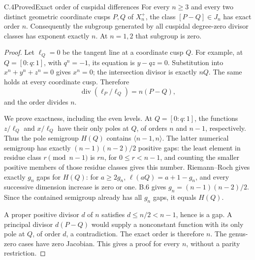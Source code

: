 \begin{statement}{C.4}{Proved}{Exact order of cuspidal differences}
For every \(n\ge3\) and every two distinct geometric coordinate
cusps \(P,Q\) of \(X_n^+\), the class \([P-Q]\in J_n\) has exact
order \(n\). Consequently the subgroup generated by all
cuspidal degree-zero divisor classes has exponent exactly \(n\).
At \(n=1,2\) that subgroup is zero.
\end{statement}
\begin{proof}
Let \(\ell_Q=0\) be the tangent line at a coordinate cusp \(Q\).
For example, at \(Q=[0:q:1]\), with \(q^n=-1\), its equation is
\(y-qz=0\). Substitution into \(x^n+y^n+z^n=0\) gives \(x^n=0\);
the intersection divisor is exactly \(nQ\). The same holds at
every coordinate cusp. Therefore
\[
 \operatorname{div}(\ell_P/\ell_Q)=n(P-Q),                    \tag{C.5}
\]
and the order divides \(n\).

We prove exactness, including the even levels. At \(Q=[0:q:1]\),
the functions \(z/\ell_Q\) and \(x/\ell_Q\) have their only poles
at \(Q\), of orders \(n\) and \(n-1\), respectively. Thus the pole
semigroup \(H(Q)\) contains \(\langle n-1,n\rangle\).
The latter numerical semigroup has exactly
\((n-1)(n-2)/2\) positive gaps: the least element in residue
class \(r\pmod{n-1}\) is \(rn\), for \(0\le r<n-1\), and counting
the smaller positive members of those residue classes gives this
number. Riemann--Roch gives exactly \(g_n\) gaps for \(H(Q)\):
for \(a\ge2g_n\), \(\ell(aQ)=a+1-g_n\), and every successive
dimension increase is zero or one. B.6 gives
\(g_n=(n-1)(n-2)/2\). Since the contained semigroup already has
all \(g_n\) gaps, it equals \(H(Q)\).

A proper positive divisor \(d\) of \(n\) satisfies
\(d\le n/2<n-1\), hence is a gap. A principal divisor
\(d(P-Q)\) would supply a nonconstant function with its only
pole at \(Q\), of order \(d\), a contradiction. The exact order
is therefore \(n\). The genus-zero cases have zero Jacobian.
This gives a proof for every \(n\), without a parity restriction.
\end{proof}

